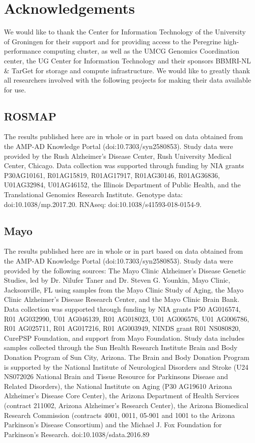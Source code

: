 \section*{Acknowledgements}
We would like to thank the Center for Information Technology of the University of Groningen for their support and for providing access to the Peregrine high-performance computing cluster, as well as the UMCG Genomics Coordination center, the UG Center for Information Technology and their sponsors BBMRI-NL \& TarGet for storage and compute infrastructure. We would like to greatly thank all researchers involved with the following projects for making their data available for use. 

\subsection{ROSMAP}

The results published here are in whole or in part based on data obtained from the AMP-AD Knowledge Portal (doi:10.7303/syn2580853). Study data were provided by the Rush Alzheimer’s Disease Center, Rush University Medical Center, Chicago. Data collection was supported through funding by NIA grants P30AG10161, R01AG15819, R01AG17917, R01AG30146, R01AG36836, U01AG32984, U01AG46152, the Illinois Department of Public Health, and the Translational Genomics Research Institute. 
Genotype data: doi:10.1038/mp.2017.20. RNAseq: doi:10.1038/s41593-018-0154-9.  

\subsection{Mayo}

The results published here are in whole or in part based on data obtained from the AMP-AD Knowledge Portal (doi:10.7303/syn2580853). Study data were provided by the following sources: The Mayo Clinic Alzheimer’s Disease Genetic Studies, led by Dr. Nilufer Taner and Dr. Steven G. Younkin, Mayo Clinic, Jacksonville, FL using samples from the Mayo Clinic Study of Aging, the Mayo Clinic Alzheimer’s Disease Research Center, and the Mayo Clinic Brain Bank. Data collection was supported through funding by NIA grants P50 AG016574, R01 AG032990, U01 AG046139, R01 AG018023, U01 AG006576, U01 AG006786, R01 AG025711, R01 AG017216, R01 AG003949, NINDS grant R01 NS080820, CurePSP Foundation, and support from Mayo Foundation. Study data includes samples collected through the Sun Health Research Institute Brain and Body Donation Program of Sun City, Arizona. The Brain and Body Donation Program is supported by the National Institute of Neurological Disorders and Stroke (U24 NS072026 National Brain and Tissue Resource for Parkinsons Disease and Related Disorders), the National Institute on Aging (P30 AG19610 Arizona Alzheimer’s Disease Core Center), the Arizona Department of Health Services (contract 211002, Arizona Alzheimer’s Research Center), the Arizona Biomedical Research Commission (contracts 4001, 0011, 05-901 and 1001 to the Arizona Parkinson's Disease Consortium) and the Michael J. Fox Foundation for Parkinson’s Research.  doi:10.1038/sdata.2016.89 


